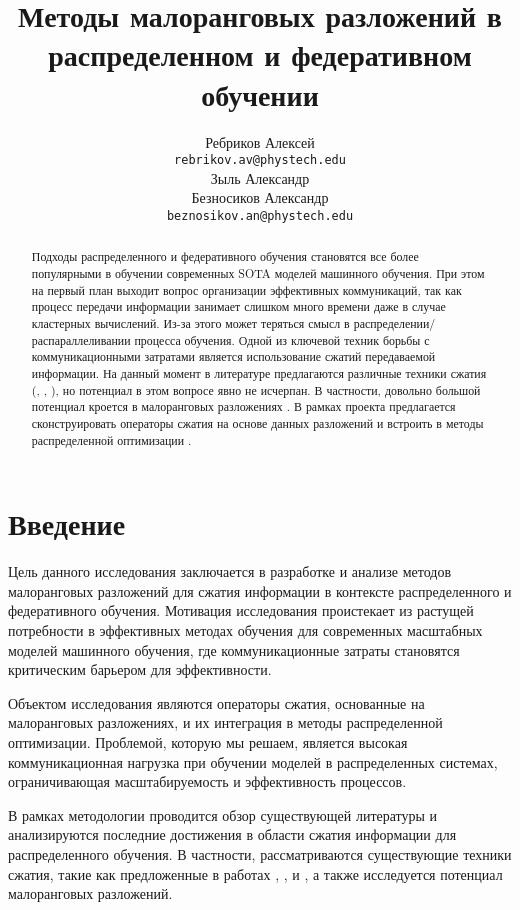 \documentclass{article}
\title{Методы малоранговых разложений в распределенном и федеративном обучении}
\author{ Ребриков Алексей \\
	\texttt{rebrikov.av@phystech.edu} \\
	\And
	Зыль Александр\\
	\And 
	Безносиков Александр\\
	\texttt{beznosikov.an@phystech.edu} \\
}
\date{}
\begin{document}
\maketitle

\begin{abstract}
	Подходы распределенного и федеративного обучения становятся все более популярными в обучении современных SOTA моделей машинного обучения. При этом на первый план выходит вопрос организации эффективных коммуникаций, так как процесс передачи информации занимает слишком много времени даже в случае кластерных вычислений. Из-за этого может теряться смысл в распределении/распараллеливании процесса обучения. Одной из ключевой техник  борьбы с коммуникационными затратами является использование сжатий передаваемой информации. На данный момент в литературе предлагаются различные техники сжатия (\citep{beznosikov2023biased}, \citep{alistarh2017qsgd}, \citep{horvoth2022natural}), но потенциал в этом вопросе явно не исчерпан. В частности, довольно большой потенциал кроется в малоранговых разложениях \citep{Gundersen2019RSVD}. В рамках проекта предлагается сконструировать операторы сжатия на основе данных разложений и встроить в методы распределенной оптимизации \citep{richtarik2021ef21}.
\end{abstract}



\section{Введение}

Цель данного исследования заключается в разработке и анализе методов малоранговых разложений для сжатия информации в контексте распределенного и федеративного обучения. Мотивация исследования проистекает из растущей потребности в эффективных методах обучения для современных масштабных моделей машинного обучения, где коммуникационные затраты становятся критическим барьером для эффективности.

Объектом исследования являются операторы сжатия, основанные на малоранговых разложениях, и их интеграция в методы распределенной оптимизации. Проблемой, которую мы решаем, является высокая коммуникационная нагрузка при обучении моделей в распределенных системах, ограничивающая масштабируемость и эффективность процессов.

В рамках методологии проводится обзор существующей литературы и анализируются последние достижения в области сжатия информации для распределенного обучения. В частности, рассматриваются существующие техники сжатия, такие как предложенные в работах \citep{beznosikov2023biased}, \citep{alistarh2017qsgd}, и \citep{horvoth2022natural}, а также исследуется потенциал малоранговых разложений.
\end{document}
